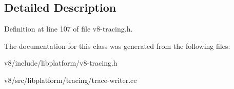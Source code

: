 \subsection{Detailed Description}


Definition at line 107 of file v8-\/tracing.\+h.



The documentation for this class was generated from the following files\+:\begin{DoxyCompactItemize}
\item 
v8/include/libplatform/v8-\/tracing.\+h\item 
v8/src/libplatform/tracing/trace-\/writer.\+cc\end{DoxyCompactItemize}
